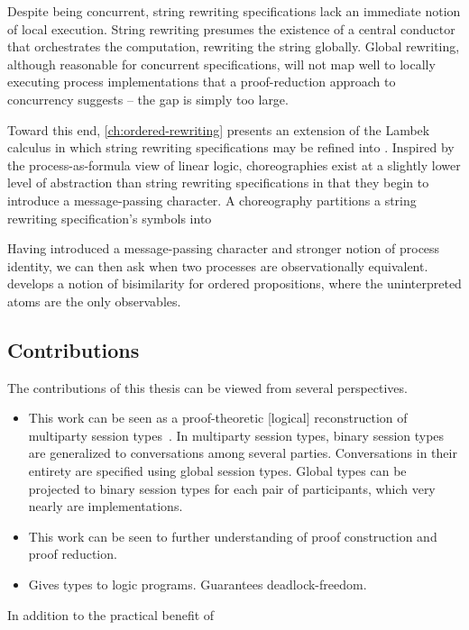 Despite being concurrent, string rewriting specifications lack an immediate notion of local execution.
String rewriting presumes the existence of a central conductor that orchestrates the computation, rewriting the string globally.
Global rewriting, although reasonable for concurrent specifications, will not map well to locally executing process implementations that a proof-reduction approach to concurrency suggests -- the gap is simply too large.

Toward this end, \cref{ch:ordered-rewriting} presents an extension of the Lambek calculus\autocite{Lambek:??} in which string rewriting specifications may be refined into .
Inspired by the process-as-formula view of linear logic\autocites{Miller:??}{Cervesato+Scedrov:IC09}, choreographies exist at a slightly lower level of abstraction than string rewriting specifications in that they begin to introduce a message-passing character.
A choreography partitions a string rewriting specification's symbols into 

Having introduced a message-passing character and stronger notion of process identity, we can then ask when two processes are observationally equivalent.
 develops a notion of bisimilarity for ordered propositions, where the uninterpreted atoms are the only observables.

\subsection{Contributions}

The contributions of this thesis can be viewed from several perspectives.
\begin{itemize}
\item This work can be seen as a proof-theoretic [logical] reconstruction of multiparty session types~\autocite{Honda+:POPL08}.
In multiparty session types, binary session types are generalized to conversations among several parties.
Conversations in their entirety are specified using global session types.
Global types can be projected to binary session types for each pair of participants, which very nearly are implementations.
\item This work can be seen to further understanding of proof construction and proof reduction.
\item Gives types to logic programs.
Guarantees deadlock-freedom.
\end{itemize}
In addition to the practical benefit of 


